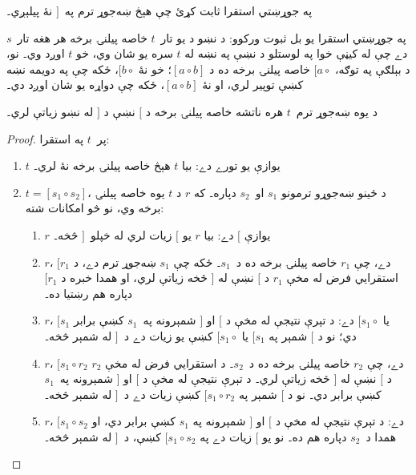 \documentclass[../../../include/open-logic-section]{subfiles}
\begin{document}
\begin{prob}
په جوړښتي استقرا ثابت کړئ چې هېڅ ښه‌جوړ ترم
په~$]$ نۀ پيلېږي۔
\end{prob}

په جوړښتي استقرا يو بل ثبوت ورکوو: د نښو د
يو تار~$t$ خاصه پيلنۍ برخه هر هغه تار~$s$ دے
چې له کيڼې خوا په لوستلو د نښې په نښه له $t$
سره يو شان وي، خو $t$ اوږد وي۔ نو، د بېلګې په
توګه، $[a \circ {}$ خاصه پيلنۍ برخه ده د
$[a \circ b]$؛ خو نۀ $[b \circ {}$، ځکه چې په
دويمه نښه کښې توپير لري، او نۀ $[a
\circ b]$، ځکه چې دواړه يو شان اوږد دي۔

\begin{prop}
د يوه ښه‌جوړ ترم~$t$ هره ناتشه خاصه پيلنۍ برخه
د $[$ نښې د $]$ له نښو زياتې لري۔
\end{prop}

\begin{proof}
پر~$t$ په استقرا:
  \begin{enumerate}
  \item $t$ يوازې يو تورے دے: بيا $t$ هېڅ خاصه پيلنۍ برخه نۀ لري۔
  \item $t = [s_1 \circ s_2]$، د ځينو ښه‌جوړو ترمونو
  $s_1$ او~$s_2$ دپاره۔ که $r$ د $t$ يوه خاصه
  پيلنۍ برخه وي، نو څو امکانات شته:
    \begin{enumerate}
    \item $r$ يوازې $[$ دے: بيا $r$ يو $[$ زيات لري
      له خپلو~$]$ څخه۔
    \item $r$، $[r_1$ دے، چې $r_1$ خاصه پيلنۍ برخه
      ده د~$s_1$۔ ځکه چې $s_1$ ښه‌جوړ ترم دے، د
      استقرايي فرض له مخې $r_1$ د $[$ نښې له
      $]$ څخه زياتې لري، او همدا خبره د $[r_1$
      دپاره هم رښتيا ده۔
    \item $r$، $[s_1$ يا $[s_1 \circ {}$ دے: د
      تېرې نتيجې له مخې د $[$ او $]$ شمېرونه
      په~$s_1$ کښې برابر دي؛ نو د $[$ شمېر
      په $[s_1$ يا $[s_1 \circ {}$ کښې يو زيات
      دے د~$]$ له شمېر څخه۔
    \item $r$، $[s_1 \circ r_2$ دے، چې $r_2$ خاصه
      پيلنۍ برخه ده د~$s_2$۔ د استقرايي فرض
      له مخې $r_2$ د $[$ نښې له $]$ څخه زياتې
      لري۔ د تېرې نتيجې له مخې د $[$ او
      $]$ شمېرونه په~$s_1$ کښې برابر دي۔ نو
      د $[$ شمېر په $[s_1 \circ r_2$ کښې زيات
      دے د~$]$ له شمېر څخه۔
    \item $r$، $[s_1 \circ s_2$ دے: د تېرې نتيجې
      له مخې د $[$ او $]$ شمېرونه په $s_1$
      کښې برابر دي، او همدا د~$s_2$ دپاره
      هم ده۔ نو يو $[$ زيات دے په $[s_1 \circ s_2$
      کښې، د~$]$ له شمېر څخه۔
    \end{enumerate}
  \end{enumerate}
\end{proof}
\end{document}
